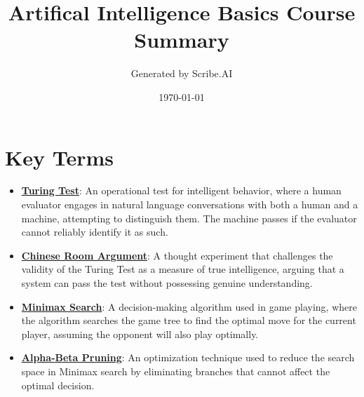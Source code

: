\documentclass{article}%
\title{Artifical Intelligence Basics Course Summary}%
\author{Generated by Scribe.AI}%
\date{\today}%
\begin{document}
%
\normalsize%
\maketitle%
\section{Key Terms}%
\label{sec:KeyTerms}%
\begin{itemize}[leftmargin=*]%
\item \href{\url{https://purdue.brightspace.com/d2l/common/assets/pdfjs-d2l-dist/1.0.14-legacy/web/viewer.html?file=\%252Fcontent\%252Fenforced\%252F1095467-wl.202510.CS.24300.001\%252F02L2-Intro.pdf\%253Fou\%253D1095467\&lang=en-us\&container=d2l-fileviewer-rendered-pdf\&fullscreen=d2l-fileviewer-rendered-pdf-dialog\&height=667}#page=6}{\textbf{Turing Test}}: An operational test for intelligent behavior, where a human evaluator engages in natural language conversations with both a human and a machine, attempting to distinguish them. The machine passes if the evaluator cannot reliably identify it as such.%
\item \href{\url{https://purdue.brightspace.com/d2l/common/assets/pdfjs-d2l-dist/1.0.14-legacy/web/viewer.html?file=\%252Fcontent\%252Fenforced\%252F1095467-wl.202510.CS.24300.001\%252F02L2-Intro.pdf\%253Fou\%253D1095467\&lang=en-us\&container=d2l-fileviewer-rendered-pdf\&fullscreen=d2l-fileviewer-rendered-pdf-dialog\&height=667}#page=7}{\textbf{Chinese Room Argument}}: A thought experiment that challenges the validity of the Turing Test as a measure of true intelligence, arguing that a system can pass the test without possessing genuine understanding.%
\item \href{\url{https://purdue.brightspace.com/d2l/common/assets/pdfjs-d2l-dist/1.0.14-legacy/web/viewer.html?file=\%252Fcontent\%252Fenforced\%252F1095467-wl.202510.CS.24300.001\%252F02L2-Intro.pdf\%253Fou\%253D1095467\&lang=en-us\&container=d2l-fileviewer-rendered-pdf\&fullscreen=d2l-fileviewer-rendered-pdf-dialog\&height=667}#page=22}{\textbf{Minimax Search}}: A decision-making algorithm used in game playing, where the algorithm searches the game tree to find the optimal move for the current player, assuming the opponent will also play optimally.%
\item \href{\url{https://purdue.brightspace.com/d2l/common/assets/pdfjs-d2l-dist/1.0.14-legacy/web/viewer.html?file=\%252Fcontent\%252Fenforced\%252F1095467-wl.202510.CS.24300.001\%252F02L2-Intro.pdf\%253Fou\%253D1095467\&lang=en-us\&container=d2l-fileviewer-rendered-pdf\&fullscreen=d2l-fileviewer-rendered-pdf-dialog\&height=667}#page=23}{\textbf{Alpha{-}Beta Pruning}}: An optimization technique used to reduce the search space in Minimax search by eliminating branches that cannot affect the optimal decision.%

\end{itemize}
\end{document}
